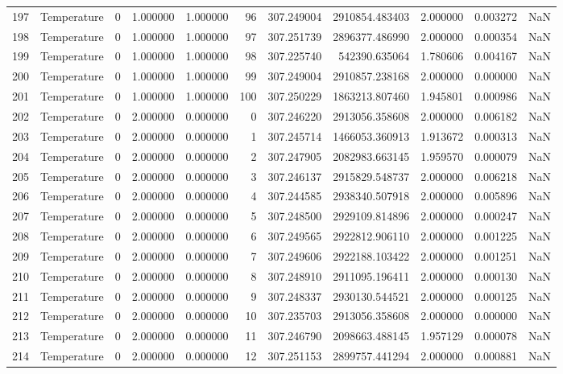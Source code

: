 \begin{tabular}{llrrrrrrrrr}
197 & Temperature & 0 & 1.000000 & 1.000000 & 96 & 307.249004 & 2910854.483403 & 2.000000 & 0.003272 & NaN \\
198 & Temperature & 0 & 1.000000 & 1.000000 & 97 & 307.251739 & 2896377.486990 & 2.000000 & 0.000354 & NaN \\
199 & Temperature & 0 & 1.000000 & 1.000000 & 98 & 307.225740 & 542390.635064 & 1.780606 & 0.004167 & NaN \\
200 & Temperature & 0 & 1.000000 & 1.000000 & 99 & 307.249004 & 2910857.238168 & 2.000000 & 0.000000 & NaN \\
201 & Temperature & 0 & 1.000000 & 1.000000 & 100 & 307.250229 & 1863213.807460 & 1.945801 & 0.000986 & NaN \\
202 & Temperature & 0 & 2.000000 & 0.000000 & 0 & 307.246220 & 2913056.358608 & 2.000000 & 0.006182 & NaN \\
203 & Temperature & 0 & 2.000000 & 0.000000 & 1 & 307.245714 & 1466053.360913 & 1.913672 & 0.000313 & NaN \\
204 & Temperature & 0 & 2.000000 & 0.000000 & 2 & 307.247905 & 2082983.663145 & 1.959570 & 0.000079 & NaN \\
205 & Temperature & 0 & 2.000000 & 0.000000 & 3 & 307.246137 & 2915829.548737 & 2.000000 & 0.006218 & NaN \\
206 & Temperature & 0 & 2.000000 & 0.000000 & 4 & 307.244585 & 2938340.507918 & 2.000000 & 0.005896 & NaN \\
207 & Temperature & 0 & 2.000000 & 0.000000 & 5 & 307.248500 & 2929109.814896 & 2.000000 & 0.000247 & NaN \\
208 & Temperature & 0 & 2.000000 & 0.000000 & 6 & 307.249565 & 2922812.906110 & 2.000000 & 0.001225 & NaN \\
209 & Temperature & 0 & 2.000000 & 0.000000 & 7 & 307.249606 & 2922188.103422 & 2.000000 & 0.001251 & NaN \\
210 & Temperature & 0 & 2.000000 & 0.000000 & 8 & 307.248910 & 2911095.196411 & 2.000000 & 0.000130 & NaN \\
211 & Temperature & 0 & 2.000000 & 0.000000 & 9 & 307.248337 & 2930130.544521 & 2.000000 & 0.000125 & NaN \\
212 & Temperature & 0 & 2.000000 & 0.000000 & 10 & 307.235703 & 2913056.358608 & 2.000000 & 0.000000 & NaN \\
213 & Temperature & 0 & 2.000000 & 0.000000 & 11 & 307.246790 & 2098663.488145 & 1.957129 & 0.000078 & NaN \\
214 & Temperature & 0 & 2.000000 & 0.000000 & 12 & 307.251153 & 2899757.441294 & 2.000000 & 0.000881 & NaN \\

\end{tabular}
